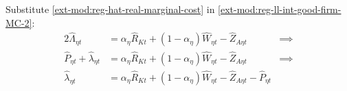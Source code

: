 \documentclass[../thesis.tex]{subfiles}
\begin{document}
Substitute \ref{ext-mod:reg-hat-real-marginal-cost} in \ref{ext-mod:reg-ll-int-good-firm-MC-2}:
\begin{alignat}{2}
	\hat{\Lambda}_{\eta t} &= {\alpha_{\eta}} \hat{R}_{Kt} + (1- {\alpha_{\eta}}) \hat{W}_{\eta t} - \hat{Z}_{A\eta t} &\implies \nonumber \\
	\hat{P}_{\eta t} + \hat{\lambda}_{\eta t} &= {\alpha_{\eta}} \hat{R}_{Kt} + (1- {\alpha_{\eta}}) \hat{W}_{\eta t} - \hat{Z}_{A\eta t} &\implies \nonumber \\
	\hat{\lambda}_{\eta t} &= {\alpha_{\eta}} \hat{R}_{Kt} + (1- {\alpha_{\eta}}) \hat{W}_{\eta t} - \hat{Z}_{A\eta t} - \hat{P}_{\eta t} \label{ext-mod:reg-ll-int-good-firm-MC-3}
\end{alignat}

\begin{comment}

\subsubsection*{Marginal Cost}

Log-linearize \ref{ext-mod:reg-int-good-firm-MC-2}:
\begin{alignat}{2}
	& \Lambda_{\eta t} = Z_{A\eta t}^{-1} \frac{R_{Kt}^{{\alpha_{\eta}}} W_{\eta t}^{1-\alpha_{\eta}}}{{\alpha_{\eta}}^{{\alpha_{\eta}}} (1-\alpha_{\eta})^{1-\alpha_{\eta}}} \implies \tag{\ref{ext-mod:reg-int-good-firm-MC-2}} \\
	& \Lambda (1+ \hat{\Lambda}_{\eta t}) = \nonumber \\ & \qquad = \frac{1}{Z_{A\eta}} \left( \frac{R_{K}}{{\alpha_{\eta}}} \right)^{{\alpha_{\eta}}} \left( \frac{W}{1-\alpha_{\eta}} \right)^{1-\alpha_{\eta}} (1- \hat{Z}_{A\eta t} + {\alpha_{\eta}} \hat{R}_{Kt} + (1- {\alpha_{\eta}}) \hat{W}_{\eta t} ) \implies \nonumber \\
	& \hat{\Lambda}_{\eta t} = {\alpha_{\eta}} \hat{R}_{Kt} + (1- {\alpha_{\eta}}) \hat{W}_{\eta t} - \hat{Z}_{A\eta t} \label{ext-mod:reg-ll-int-good-firm-MC-2}
\end{alignat}
	
\end{comment}




\begin{comment}
	
	Log-linearize \ref{ext-mod:reg-int-good-firm-prod-function} and then substitute \ref{ext-mod:reg-hat-real-marginal-cost}:
	\begin{align}
		\Lambda_{\eta t} &= \frac{W_{\eta t}}{Z_{A\eta t}} \tag{\ref{ext-mod:reg-int-good-firm-prod-function}} \implies \\
		\hat{\Lambda}_{\eta t} &= \hat{W}_{\eta t} - \hat{Z}_{A\eta t} \implies \nonumber \\
		\hat{P}_{\eta t} + \hat{\lambda}_{\eta t} &= \hat{W}_{\eta t} - \hat{Z}_{A\eta t} \label{ext-mod:reg-int-good-firm-FOC-Lt-ll}
	\end{align}
	
\end{comment}
\end{document}
